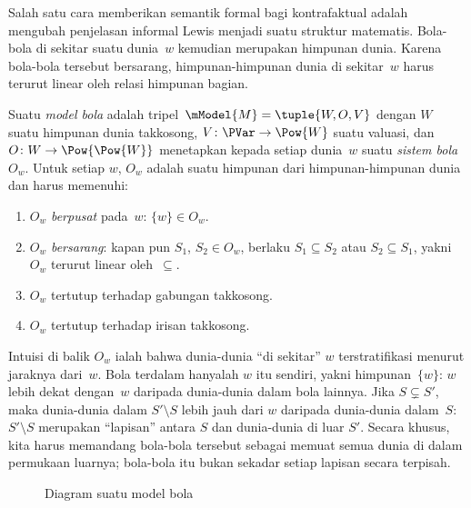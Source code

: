 \documentclass[../../../include/open-logic-section]{subfiles}
\begin{document}


Salah satu cara memberikan semantik formal bagi kontrafaktual adalah mengubah
penjelasan informal Lewis menjadi suatu struktur matematis. Bola-bola di
sekitar suatu dunia~$w$ kemudian merupakan himpunan dunia. Karena bola-bola
tersebut bersarang, himpunan-himpunan dunia di sekitar~$w$ harus terurut
linear oleh relasi himpunan bagian.

\begin{defn}
  Suatu \emph{model bola} adalah tripel~$\mModel{M} = \tuple{W, O, V}$
  dengan $W$ suatu himpunan dunia takkosong, $V\colon \PVar \to \Pow{W}$
  suatu valuasi, dan $O\colon W \to \Pow{\Pow{W}}$ menetapkan kepada setiap
  dunia~$w$ suatu \emph{sistem bola}~$O_w$. Untuk setiap $w$, $O_w$ adalah
  suatu himpunan dari himpunan-himpunan dunia dan harus memenuhi:
  \begin{enumerate}
  \item $O_w$ \emph{berpusat} pada~$w$: $\{w\} \in O_w$.
  \item $O_w$ \emph{bersarang}: kapan pun $S_1$, $S_2 \in O_w$, berlaku $S_1
    \subseteq S_2$ atau $S_2 \subseteq S_1$, yakni $O_w$ terurut linear
    oleh~$\subseteq$.
  \item $O_w$ tertutup terhadap gabungan takkosong.
  \item $O_w$ tertutup terhadap irisan takkosong.
  \end{enumerate}
\end{defn}

Intuisi di balik $O_w$ ialah bahwa dunia-dunia ``di sekitar'' $w$
terstratifikasi menurut jaraknya dari~$w$. Bola terdalam hanyalah $w$ itu
sendiri, yakni himpunan~$\{w\}$: $w$ lebih dekat dengan~$w$ daripada
dunia-dunia dalam bola lainnya. Jika $S \subsetneq S'$, maka dunia-dunia
dalam $S' \setminus S$ lebih jauh dari $w$ daripada dunia-dunia dalam~$S$:
$S' \setminus S$ merupakan ``lapisan'' antara $S$ dan dunia-dunia di luar
$S'$. Secara khusus, kita harus memandang bola-bola tersebut sebagai memuat
semua dunia di dalam permukaan luarnya; bola-bola itu bukan sekadar setiap
lapisan secara terpisah.

\begin{figure}
\begin{center}
\caption{Diagram suatu model bola}
\end{center}
\end{figure}
\end{document}
